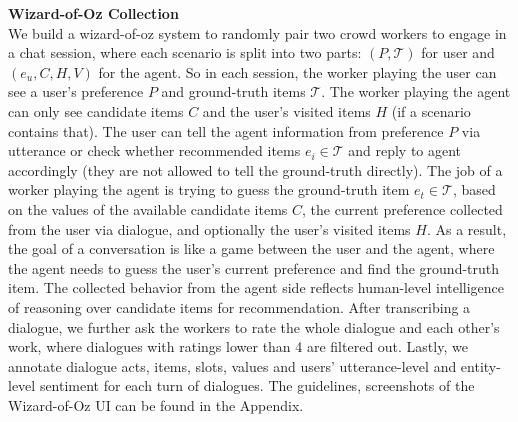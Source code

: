 \begin{table}[H]
    \centering
    \caption{Statistics of MGConvRex Dataset}     
\label{chap6:tbl:dataset}
\end{table}

\textbf{Wizard-of-Oz Collection}\\
\label{chap6:sec:woz}
We build a wizard-of-oz system to randomly pair two crowd workers to engage in a chat session, where each scenario is split into two parts:
$(P, \mathcal{T})$ for user and $(e_u, C, H, V)$ for the agent.
So in each session, the worker playing the user can see a user's preference $P$ and ground-truth items $\mathcal{T}$. 
The worker playing the agent can only see candidate items $C$ and the user's visited items $H$ (if a scenario contains that).
The user can tell the agent information from preference $P$ via utterance or check whether recommended items $e_i \in \mathcal{T}$ and reply to agent accordingly (they are not allowed to tell the ground-truth directly). 
The job of a worker playing the agent is trying to guess the ground-truth item $e_t \in \mathcal{T}$, based on the values of the available candidate items $C$, the current preference collected from the user via dialogue, and optionally the user's visited items $H$.
As a result, the goal of a conversation is like a game between the user and the agent, where the agent needs to guess the user's current preference and find the ground-truth item.
The collected behavior from the agent side reflects human-level intelligence of reasoning over candidate items for recommendation.
After transcribing a dialogue, we further ask the workers to rate the whole dialogue and each other's work, where
dialogues with ratings lower than 4 are filtered out.
Lastly, we annotate dialogue acts, items, slots, values and users' utterance-level and entity-level sentiment for each turn of dialogues.
The guidelines, screenshots of the Wizard-of-Oz UI can be found in the Appendix.

